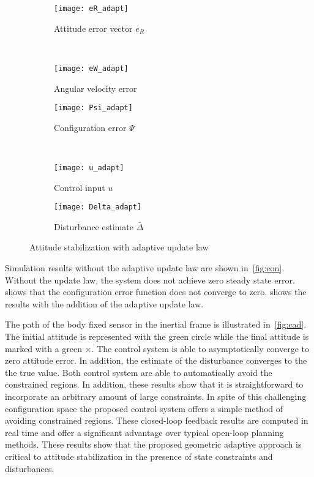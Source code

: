 \documentclass[letterpaper, 10 pt, conference]{ieeeconf}  %
\begin{document}
\begin{figure} 
	\centering 
	\begin{subfigure}[htbp]{0.5\columnwidth} 
		\texttt{[image: eR\_adapt]} 
		\caption{Attitude error vector \(e_R\) } \label{fig:eR_adapt} 
	\end{subfigure}~ %
	\begin{subfigure}[htbp]{0.5\columnwidth} 
		\texttt{[image: eW\_adapt]} 
		\caption{Angular velocity error} \label{fig:eW_adapt} 
	\end{subfigure} 
	
	\begin{subfigure}[htbp]{0.5\columnwidth} 
		\texttt{[image: Psi\_adapt]} 
		\caption{Configuration error \( \Psi \)} \label{fig:Psi_adapt} 
	\end{subfigure}~
	\begin{subfigure}[htbp]{0.5\columnwidth} 
		\texttt{[image: u\_adapt]} 
		\caption{Control input \( u\)} \label{fig:u_adapt} 
	\end{subfigure} 
	
	\begin{subfigure}[htbp]{0.5\columnwidth} 
		\texttt{[image: Delta\_adapt]} 
		\caption{Disturbance estimate \( \bar{\Delta}\)} \label{fig:Delta_adapt} 
	\end{subfigure}
	\caption{Attitude stabilization with adaptive update law}
	\label{fig:adapt} 
\end{figure}

Simulation results without the adaptive update law are shown in~\cref{fig:con}.
Without the update law, the system does not achieve zero steady state error. 
 shows that the configuration error function does not converge to zero.
 shows the results with the addition of the adaptive update law.

The path of the body fixed sensor in the inertial frame is illustrated in~\cref{fig:cad}.
The initial attitude is represented with the green circle while the final attitude is marked with a green \(\times\).
The control system is able to asymptotically converge to zero attitude error.
In addition, the estimate of the disturbance converges to the the true value.
Both control system are able to automatically avoid the constrained regions. 
In addition, these results show that it is straightforward to incorporate an arbitrary amount of large constraints.
In spite of this challenging configuration space the proposed control system offers a simple method of avoiding constrained regions.
These closed-loop feedback results are computed in real time and offer a significant advantage over typical open-loop planning methods.
These results show that the proposed geometric adaptive approach is critical to attitude stabilization in the presence of state constraints and disturbances.
\end{document}

